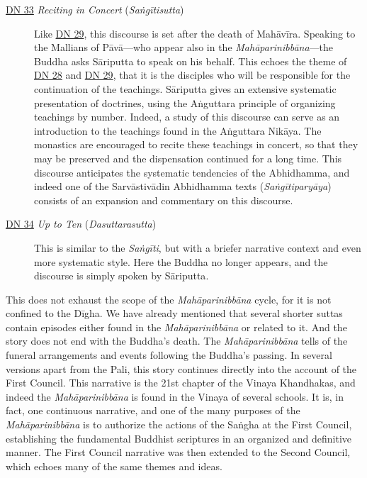 \documentclass[12pt,openany]{book}%
\begin{document}
\begin{description}
\item[\href{https://suttacentral.net/dn33}{DN 33} \textit{Reciting in Concert} (\textit{\textsanskrit{Saṅgītisutta}})] Like \href{https://suttacentral.net/dn29}{DN 29}, this discourse is set after the death of \textsanskrit{Mahāvīra}. Speaking to the Mallians of \textsanskrit{Pāvā}—who appear also in the \textit{\textsanskrit{Mahāparinibbāna}}—the Buddha asks \textsanskrit{Sāriputta} to speak on his behalf. This echoes the theme of \href{https://suttacentral.net/dn28}{DN 28} and \href{https://suttacentral.net/dn29}{DN 29}, that it is the disciples who will be responsible for the continuation of the teachings. \textsanskrit{Sāriputta} gives an extensive systematic presentation of doctrines, using the \textsanskrit{Aṅguttara} principle of organizing teachings by number. Indeed, a study of this discourse can serve as an introduction to the teachings found in the \textsanskrit{Aṅguttara} \textsanskrit{Nikāya}. The monastics are encouraged to recite these teachings in concert, so that they may be preserved and the dispensation continued for a long time. This discourse anticipates the systematic tendencies of the Abhidhamma, and indeed one of the \textsanskrit{Sarvāstivādin} Abhidhamma texts (\textit{\textsanskrit{Saṅgītiparyāya}}) consists of an expansion and commentary on this discourse.%
\item[\href{https://suttacentral.net/dn34}{DN 34} \textit{Up to Ten} (\textit{Dasuttarasutta})] This is similar to the \textit{\textsanskrit{Saṅgīti}}, but with a briefer narrative context and even more systematic style. Here the Buddha no longer appears, and the discourse is simply spoken by \textsanskrit{Sāriputta}.%
\end{description}

This does not exhaust the scope of the \textit{\textsanskrit{Mahāparinibbāna}} cycle, for it is not confined to the \textsanskrit{Dīgha}. We have already mentioned that several shorter suttas contain episodes either found in the \textit{\textsanskrit{Mahāparinibbāna}} or related to it. And the story does not end with the Buddha’s death. The \textit{\textsanskrit{Mahāparinibbāna}} tells of the funeral arrangements and events following the Buddha’s passing. In several versions apart from the Pali, this story continues directly into the account of the First Council. This narrative is the 21st chapter of the Vinaya Khandhakas, and indeed the \textit{\textsanskrit{Mahāparinibbāna}} is found in the Vinaya of several schools. It is, in fact, one continuous narrative, and one of the many purposes of the \textit{\textsanskrit{Mahāparinibbāna}} is to authorize the actions of the \textsanskrit{Saṅgha} at the First Council, establishing the fundamental Buddhist scriptures in an organized and definitive manner. The First Council narrative was then extended to the Second Council, which echoes many of the same themes and ideas.
\end{document}
